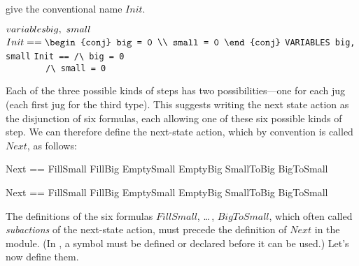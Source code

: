 give the conventional name $Init$.
\smallskip
\begin{display}
\begin{twocols}%
$\VARIABLES big,\ small$ 
$Init == 
\begin{conj}
big = 0 \\ small = 0
\end{conj}
$
\midcol
\verb*|VARIABLES big, small|
\verb*|Init == /\ big = 0| \\
\verb*|        /\ small = 0|
\end{twocols}
\end{display}
\smallskip
Each of the three possible kinds of steps has two possibilities---one
for each jug (each first jug for the third type).  This suggests
writing the next state action as the disjunction of six formulas, each
allowing one of these six possible kinds of step.  We can therefore
define the next-state action, which by convention is called $Next$, as
follows:
\medskip
\begin{twocols}%
\begin{notla}
Next == \/ FillSmall 
        \/ FillBig    
        \/ EmptySmall 
        \/ EmptyBig    
        \/ SmallToBig    
        \/ BigToSmall 
\end{notla}
\begin{tlatex}
%
%
%
%
%
%
\end{tlatex}
\midcol
\begin{verbatim*}
Next == \/ FillSmall 
        \/ FillBig    
        \/ EmptySmall 
        \/ EmptyBig    
        \/ SmallToBig    
        \/ BigToSmall 
\end{verbatim*}
\end{twocols}
\medskip
The definitions of the six formulas $FillSmall$, \ldots\,, $BigToSmall$,
which often called 
\emph{subactions} of the next-state action, must
precede the definition of $Next$ in the module.  (In \tlaplus, a
symbol must be defined or declared before it can be used.)  Let's now
define them.  

